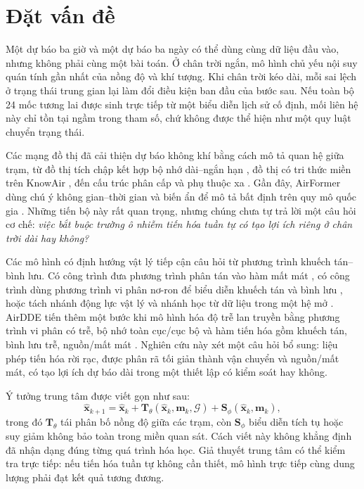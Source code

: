 \documentclass[10pt,a4paper]{article}
\begin{document}
\section{Đặt vấn đề}

Một dự báo ba giờ và một dự báo ba ngày có thể dùng cùng dữ liệu đầu vào, nhưng không phải cùng một bài toán. Ở chân trời ngắn, mô hình chủ yếu nội suy quán tính gần nhất của nồng độ và khí tượng. Khi chân trời kéo dài, mỗi sai lệch ở trạng thái trung gian lại làm đổi điều kiện ban đầu của bước sau. Nếu toàn bộ 24 mốc tương lai được sinh trực tiếp từ một biểu diễn lịch sử cố định, mối liên hệ này chỉ tồn tại ngầm trong tham số, chứ không được thể hiện như một quy luật chuyển trạng thái.

Các mạng đồ thị đã cải thiện dự báo không khí bằng cách mô tả quan hệ giữa trạm, từ đồ thị tích chập kết hợp bộ nhớ dài--ngắn hạn \citep{qi2019gclstm}, đồ thị có tri thức miền trên KnowAir \citep{wang2020pm25gnn}, đến cấu trúc phân cấp và phụ thuộc xa \citep{xu2021highair,chen2021gagnn}. Gần đây, AirFormer dùng chú ý không gian--thời gian và biến ẩn để mô tả bất định trên quy mô quốc gia \citep{liang2023airformer}. Những tiến bộ này rất quan trọng, nhưng chúng chưa tự trả lời một câu hỏi cơ chế: \emph{việc bắt buộc trường ô nhiễm tiến hóa tuần tự có tạo lợi ích riêng ở chân trời dài hay không?}

Các mô hình có định hướng vật lý tiếp cận câu hỏi từ phương trình khuếch tán--bình lưu. Có công trình đưa phương trình phân tán vào hàm mất mát \citep{zhou2022theory}, có công trình dùng phương trình vi phân nơ-ron để biểu diễn khuếch tán và bình lưu \citep{hettige2024airphynet}, hoặc tách nhánh động lực vật lý và nhánh học từ dữ liệu trong một hệ mở \citep{tian2025airdualode}. AirDDE tiến thêm một bước khi mô hình hóa độ trễ lan truyền bằng phương trình vi phân có trễ, bộ nhớ toàn cục/cục bộ và hàm tiến hóa gồm khuếch tán, bình lưu trễ, nguồn/mất mát \citep{wu2026airdde}. Nghiên cứu này xét một câu hỏi bổ sung: liệu phép tiến hóa rời rạc, được phân rã tối giản thành vận chuyển và nguồn/mất mát, có tạo lợi ích dự báo dài trong một thiết lập có kiểm soát hay không.

Ý tưởng trung tâm được viết gọn như sau:
\begin{equation}
  \widehat{\bm{x}}_{k+1}
  = \widehat{\bm{x}}_{k}
  + \bm{T}_{\theta}(\widehat{\bm{x}}_{k},\bm{m}_{k},\mathcal{G})
  + \bm{S}_{\phi}(\widehat{\bm{x}}_{k},\bm{m}_{k}),
  \label{eq:central}
\end{equation}
trong đó $\bm{T}_{\theta}$ tái phân bố nồng độ giữa các trạm, còn $\bm{S}_{\phi}$ biểu diễn tích tụ hoặc suy giảm không bảo toàn trong miền quan sát. Cách viết này không khẳng định đã nhận dạng đúng từng quá trình hóa học. Giả thuyết trung tâm có thể kiểm tra trực tiếp: nếu tiến hóa tuần tự không cần thiết, mô hình trực tiếp cùng dung lượng phải đạt kết quả tương đương.
\end{document}
